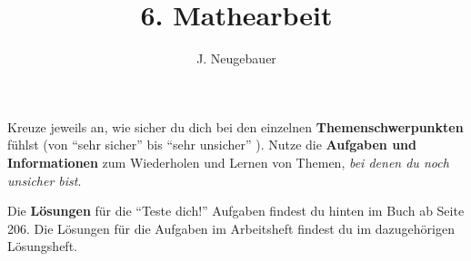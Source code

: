\documentclass[11pt, a4paper]{scrartcl}
\author{J. Neugebauer}
\title{6. Mathearbeit}
\date{\Heute}
\begin{document}
\CheckupBild\CheckupTitel

Kreuze jeweils an, wie sicher du dich bei den einzelnen \textbf{Themenschwerpunkten} fühlst (von \enquote{sehr sicher}  bis \enquote{sehr unsicher} ). Nutze die \textbf{Aufgaben und Informationen} zum Wiederholen und Lernen von Themen, \emph{bei denen du noch unsicher bist}.

Die \textbf{Lösungen} für die \enquote{Teste dich!} Aufgaben findest du hinten im Buch ab Seite 206. Die Lösungen für die Aufgaben im Arbeitsheft findest du im dazugehörigen Lösungsheft.

\begin{checkup}
\end{checkup}
\end{document}

